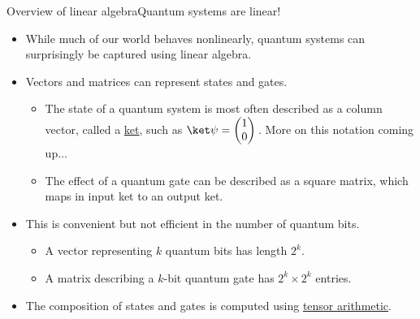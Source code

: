 \begin{frame}{Overview of linear algebra}{Quantum systems are linear!}
\begin{itemize}
    \item While much of our world behaves nonlinearly, quantum systems can surprisingly be captured using linear algebra.
    \item Vectors and matrices can represent states and gates.  
    \begin{itemize}
        \item The state of a quantum system is most often described as a column vector, called a \href{https://en.wikipedia.org/wiki/Bra-ket_notation}{ket}, such as $\QState{}=\PZero{}$.  More on this notation coming up$\ldots$
         \item The effect of a quantum gate can be described as a square matrix, which maps in input ket to an output ket.
    \end{itemize}
    \item This is convenient but not efficient in the number of quantum bits.
    \begin{itemize}
        \item A vector representing $k$ quantum bits has length $2^{k}$.
        \item A matrix describing a $k$-bit quantum gate has $2^{k} \times 2^{k}$ entries.
    \end{itemize}
    \item The composition of states and gates is computed using \href{https://en.wikipedia.org/wiki/Tensor}{tensor arithmetic}.
\end{itemize}
    
\end{frame}


